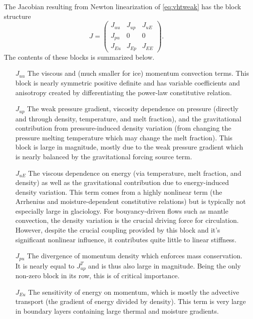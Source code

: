 The Jacobian resulting from Newton linearization of \eqref{eq:vhtweak} has the block structure
\begin{equation}\label{eq:vhtblock}
  J =
  \begin{pmatrix}
    J_{uu} & J_{up} & J_{uE} \\
    J_{pu} & 0 & 0 \\
    J_{Eu} & J_{Ep} & J_{EE}
  \end{pmatrix} .
\end{equation}
The contents of these blocks is summarized below.
\begin{itemize}
  \item[$J_{uu}$] The viscous and (much smaller for ice) momentum convection terms.
    This block is nearly symmetric positive definite and has variable coefficients and anisotropy created by differentiating the power-law constitutive relation.
  \item[$J_{up}$] The weak pressure gradient, viscosity dependence on pressure (directly and through density, temperature, and melt fraction), and the gravitational contribution from pressure-induced density variation (from changing the pressure melting temperature which may change the melt fraction).
    This block is large in magnitude, mostly due to the weak pressure gradient which is nearly balanced by the gravitational forcing source term.
  \item[$J_{uE}$] The viscous dependence on energy (via temperature, melt fraction, and density) as well as the gravitational contribution due to energy-induced density variation.
    This term comes from a highly nonlinear term (the Arrhenius and moisture-dependent constitutive relations) but is typically not especially large in glaciology.
    For bouyancy-driven flows such as mantle convection, the density variation is the crucial driving force for circulation.
    However, despite the crucial coupling provided by this block and it's significant nonlinear influence, it contributes quite little to linear stiffness.
  \item[$J_{pu}$] The divergence of momentum density which enforces mass conservation.
    It is nearly equal to $J_{up}^T$ and is thus also large in magnitude.
    Being the only non-zero block in its row, this is of critical importance.
  \item[$J_{Eu}$] The sensitivity of energy on momentum, which is mostly the advective transport (the gradient of energy divided by density).
    This term is very large in boundary layers containing large thermal and moisture gradients.

\end{itemize}

